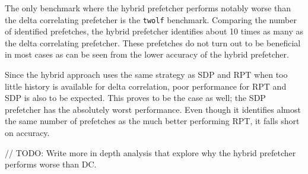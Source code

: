 The only benchmark where the hybrid prefetcher performs notably worse than the
delta correlating prefetcher is the \texttt{twolf} benchmark.
Comparing the number of identified prefetches, the hybrid prefetcher identifies
about 10 times as many as the delta correlating prefetcher.
These prefetches do not turn out to be beneficial in most cases as can be seen
from the lower accuracy of the hybrid prefetcher.

Since the hybrid approach uses the same strategy as SDP and RPT when too little
history is available for delta correlation, poor performance for RPT and SDP is
also to be expected.
This proves to be the case as well; the SDP prefetcher has the absolutely worst
performance.
Even though it identifies almost the same number of prefetches as the much
better performing RPT, it falls short on accuracy.

// TODO: Write more in depth analysis that explore why the hybrid prefetcher performs worse than DC.



